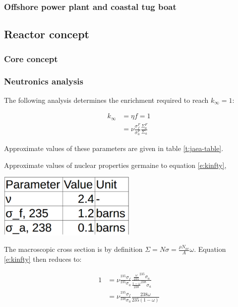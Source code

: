 \documentclass[12pt]{article}
\begin{document}
\subsubsection{Offshore power plant and coastal tug boat}
\subsection{Reactor concept}
\subsubsection{Core concept}
\subsubsection{Neutronics analysis}
The following analysis determines the enrichment required to reach $k_\infty = 1$:

\begin{align}
k_\infty &= \eta f = 1 \\
 &= \nu \frac{\sigma_f^F}{\sigma_a^F} \frac{\Sigma_a^F}{\Sigma_a} \label{e:kinfty}
\end{align}

Approximate values of these parameters are given in table \ref{t:jaea-table}.

\begin{table}[H]
\begin{center}
  \caption{Approximate values of nuclear properties germaine to equation \ref{e:kinfty}, \cite{jaea}}
  \label{t:jaea-table}
  \includegraphics[width=0.5\textwidth]{full-spectrum-nuke-data}
\end{center}
\end{table}


The macroscopic cross section is by definition $\Sigma = N \sigma = \frac{\rho N_{av}}{A} \omega$. Equation \ref{e:kinfty} then reduces to:

\begin{align}
1 &= \nu \frac{^{235}\sigma_f}{^{235}\sigma_a} \frac{\frac{\omega}{235} ^{235} \sigma_a}{\frac{1 - \omega}{238} ^{238} \sigma_a} \\
 &= \nu \frac{^{235} \sigma_f}{^{238} \sigma_a} \frac{238 \omega}{235 (1 - \omega)} 
\end{align}
\end{document}
